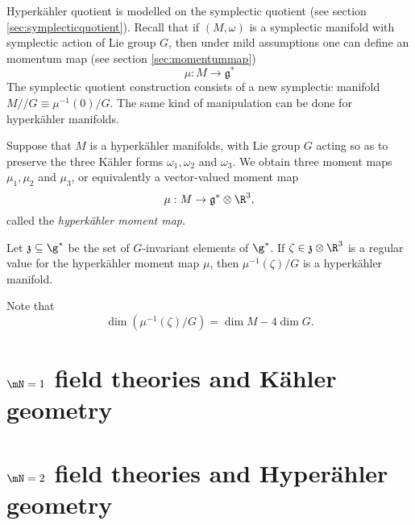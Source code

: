 \documentclass{worksheetclass}
\begin{document}
        Hyperkähler quotient is modelled on the symplectic quotient (see section \ref{sec:symplecticquotient}). Recall that if $(M,\omega)$ is a symplectic manifold with symplectic action of Lie group $G$, then under mild assumptions one can define an momentum map (see section \ref{sec:momentummap})
        \begin{equation}
            \mu:M\to\mathfrak{g}^*
        \end{equation}
        The symplectic quotient construction consists of a new symplectic manifold $M//G\equiv\mu^{-1}(0)/G$. The same kind of manipulation can be done for hyperkähler manifolds.

        Suppose that $M$ is a hyperkähler manifolds, with Lie group $G$ acting so as to preserve the three Kähler forms $\omega_1,\omega_2$ and $\omega_3$. We obtain three moment maps $\mu_1,\mu_2$ and $\mu_3$, or equivalently a vector-valued moment map
        \begin{equation}
            \mu:M\to\mathfrak{g^*}\otimes\R^3,
        \end{equation}
        called the \emph{hyperkähler moment map}.
        \begin{theorem}
            Let $\mathfrak{z}\subseteq\g^*$ be the set of $G$-invariant elements of $\g^*$. If $\zeta\in\mathfrak{z}\otimes\R^3$ is a regular value for the hyperkähler moment map $\mu$, then $\mu^{-1}(\zeta)/G$ is a hyperkähler manifold.
        \end{theorem}
        Note that
        \begin{equation}
            \dim(\mu^{-1}(\zeta)/G) = \dim M - 4\dim G.
        \end{equation}

\section{$\mN=1$ field theories and Kähler geometry}

\section{$\mN=2$ field theories and Hyperähler geometry}
\end{document}
